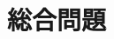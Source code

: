 \documentclass[uplatex,dvipdfmx,a4paper,11pt]{jsarticle}
\begin{document}
\begin{enumerate}
%
%

\end{enumerate}

\newpage

\section{総合問題}
\end{document}
